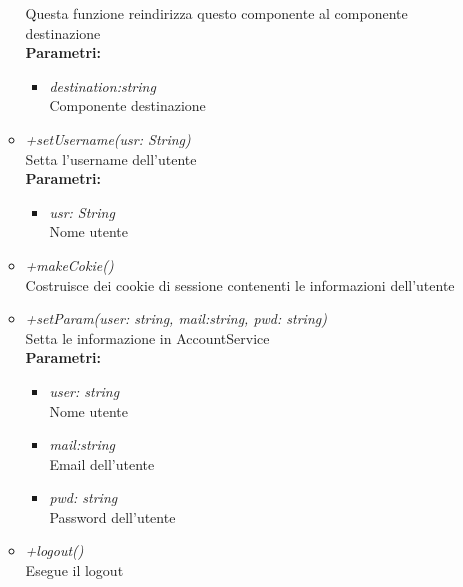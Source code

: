 \begin{itemize}
\begin{itemize}
    		Questa funzione reindirizza questo componente al componente destinazione\\
    		\textbf{Parametri:}
    		\begin{itemize}
    			\item \emph{destination:string}\\
    			Componente destinazione
    		\end{itemize}
    		\item \emph{+setUsername(usr: String)}\\
    		Setta l'username dell'utente\\
    		\textbf{Parametri:}
    		\begin{itemize}
    			\item \emph{usr: String}\\
    			Nome utente
    		\end{itemize}
    		\item \emph{+makeCokie()}\\
    		Costruisce dei cookie di sessione contenenti le informazioni dell'utente
    		\item \emph{+setParam(user: string, mail:string, pwd: string)}\\
    		Setta le informazione in AccountService\\
    		\textbf{Parametri:}
    		\begin{itemize}
    			\item \emph{user: string}\\
    			Nome utente
    			\item \emph{mail:string}\\
    			Email dell'utente
    			\item \emph{pwd: string}\\
    			Password dell'utente
    		\end{itemize}
    		\item \emph{+logout()}\\
    		Esegue il logout
		\end{itemize}
\end{itemize}